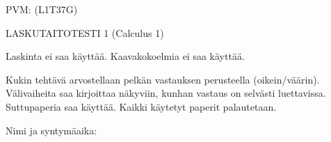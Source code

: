 \documentclass[finnish, a4paper, 12pt]{article}
\begin{document}
	
	
		PVM: \underline{\phantom{mm.mm.}}
		\hfill
		(L1T37G)	%
	
	\begin{center}
		{\large
			LASKUTAITOTESTI 1 (Calculus 1)}
	\end{center}
	
	Laskinta ei saa käyttää. Kaavakokoelmia ei saa käyttää.
	
	Kukin tehtävä arvostellaan pelkän vastauksen perusteella (oikein/väärin).
	Välivaiheita saa kirjoittaa näkyviin, kunhan vastaus on selvästi luettavissa.
	Suttupaperia saa käyttää. Kaikki käytetyt paperit palautetaan.
	
\vspace{12pt}
Nimi ja syntymäaika: \phantom{m} \hrulefill
\vspace{8pt}
	
\end{document}
